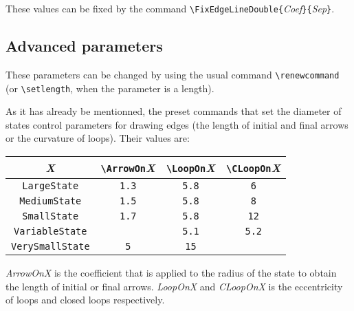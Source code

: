 \documentclass[11pt,twoside]{article}
\begin{document}
These values can be fixed by the command \verb+\FixEdgeLineDouble{+\textsl{Coef}\verb+}{+\textsl{Sep}\texttt{\}}.

\subsection{Advanced parameters}
These parameters can be changed by using the usual command \verb+\renewcommand+
(or \verb+\setlength+, when the parameter is a length).

As it has already be mentionned, the preset commands that set
the diameter of states control
parameters for drawing edges (the length of initial and final arrows or
the curvature of loops). Their values are:
\begin{center}
\begin{tabular}{c|c|c|c|}
\textit{X} & \verb+\ArrowOn+\textit{X} & \verb+\LoopOn+\textit{X} & \verb+\CLoopOn+\textit{X}\\
\hline
\verb+LargeState+ & \texttt{1.3} & \texttt{5.8} & \texttt{6}\\
\hline
\verb+MediumState+ & \texttt{1.5} & \texttt{5.8} & \texttt{8}\\
\hline
\verb+SmallState+ & \texttt{1.7} & \texttt{5.8} & \texttt{12}\\
\hline
\verb+VariableState+ &  & \texttt{5.1} & \texttt{5.2}\\
\hline
\verb+VerySmallState+ & \texttt{5} & \texttt{15} & \\
\hline
\end{tabular}
\end{center}

\textit{ArrowOnX} is the coefficient that is applied to the radius of the state
to obtain the length of initial or final arrows. \textit{LoopOnX} and 
\textit{CLoopOnX}
is the eccentricity of loops and closed loops respectively.
\end{document}
